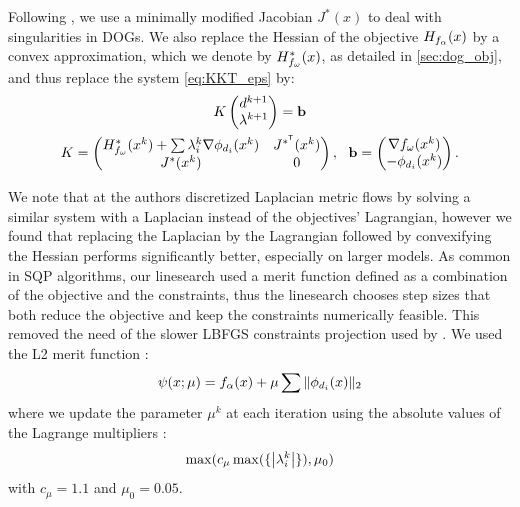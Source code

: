Following \cite{rabi2018shape}, we use a minimally modified Jacobian $J^*(x)$ to deal with singularities in DOGs. We also replace the Hessian of the objective $H_{f_\alpha}(x)$  by a convex approximation, which we denote by $H^*_{f_\omega}(x)$, as detailed in \ref{sec:dog_obj}, and thus replace the system \eqref{eq:KKT_eps} by:
%
\begin{equation} \label{eq:KKT_us}
\begin{gathered}
{K} \begin{pmatrix} d^{k+1} \\ \lambda^{k+1} \end{pmatrix}=\mathbf{b} \\
{K}=\begin{pmatrix}
{ H^*_{f_\omega}(\x^k)+\sum\lambda_i^{k} \nabla \phi_{d_i}(\x^k)} & {J^{*^\tr}(\x^k)}\\
{J^*(\x^k)} &  0 \\
\end{pmatrix}, \ \ 
\mathbf{b}=\begin{pmatrix}
{\nabla f_\omega(x^k)} \\ 
-\phi_{d_i}(x^k)\\
\end{pmatrix}.
\end{gathered}
\end{equation}

We note that at \cite{rabi2018shape} the authors discretized Laplacian metric flows by solving a similar system with a Laplacian instead of the objectives' Lagrangian, however we found that replacing the Laplacian by the Lagrangian followed by convexifying the Hessian performs significantly better, especially on larger models. As common in SQP algorithms, our linesearch used a merit function defined as a combination of the objective and the constraints, thus the linesearch chooses step sizes that both reduce the objective and keep the constraints numerically feasible. This removed the need of the slower LBFGS constraints projection used by \cite{rabi18,rabi2018shape}. We used the L2 merit function \cite{nocedal}:
\begin{equation}
\psi(x;\mu) = f_\alpha(x)+\mu\sum\|\phi_{d_i}(x)\|_2
\end{equation}
where we update the parameter $\mu^k$ at each iteration using the absolute values of the Lagrange multipliers \cite{nocedal}:
\begin{equation}
\max(c_\mu \max(\{\left\vert\lambda_i^k\right\vert\}), \mu_0)	
\end{equation}
with $c_\mu = 1.1$ and $\mu_0 = 0.05$.

